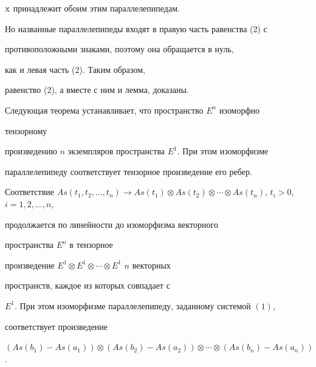 $\mathrm{x}$ принадлежит обоим этим параллелепипедам.  


Но названные параллелепипеды входят в правую часть равенства (2) с  


противоположными знаками, поэтому она обращается в нуль, 


как и левая часть (2). Таким образом, 


равенство (2), а вместе с ним и лемма, доказаны. 


 


Следующая теорема устанавливает, что пространство $E^n$ изоморфно 


тензорному  


произведению $n$ экземпляров пространства $E^1$. При этом изоморфизме  


параллелепипеду соответствует тензорное произведение его ребер.  


 


\begin{thm} 


Соответствие $As(t_1,t_2,\dotsc,t_n)\to As(t_1)\otimes As 


(t_2)\otimes\dotsb\otimes As(t_n)$, $t_i>0$, $i=1,2,\dotsc,n$, 


продолжается по линейности до изоморфизма векторного  


пространства $E^n$ в тензорное  


произведение $E^1\otimes E^1\otimes\dotsb\otimes E^1$\; $n$ векторных 


пространств, каждое из которых совпадает с 


$E^1$. При этом изоморфизме параллелепипеду, заданному системой $(1)$, 


соответствует произведение 


$(As(b_1)-As(a_1))\otimes (As(b_2)-As(a_2))\otimes \dotsb\otimes 


(As(b_n)-As(a_n))$. 


\end{thm} 


 


